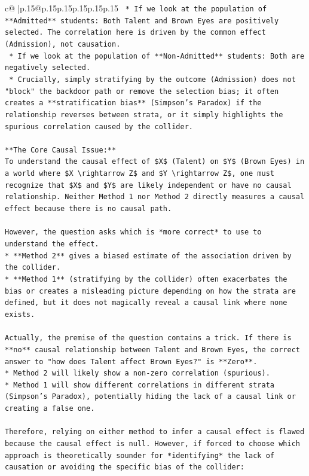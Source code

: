 \documentclass{article}
\begin{document}
{\begin{supertabular}{c@{$\;$}|p{.15\linewidth}@{}p{.15\linewidth}p{.15\linewidth}p{.15\linewidth}p{.15\linewidth}p{.15\linewidth}}
{{{\texttt{    *   If we look at the population of **Admitted** students: Both Talent and Brown Eyes are positively selected. The correlation here is driven by the common effect (Admission), not causation.} \\
\texttt{    *   If we look at the population of **Non{-}Admitted** students: Both are negatively selected.} \\
\texttt{    *   Crucially, simply stratifying by the outcome (Admission) does not "block" the backdoor path or remove the selection bias; it often creates a **stratification bias** (Simpson's Paradox) if the relationship reverses between strata, or it simply highlights the spurious correlation caused by the collider.} \\
\\ 
\texttt{**The Core Causal Issue:**} \\
\texttt{To understand the causal effect of \$X\$ (Talent) on \$Y\$ (Brown Eyes) in a world where \$X \textbackslash{}rightarrow Z\$ and \$Y \textbackslash{}rightarrow Z\$, one must recognize that \$X\$ and \$Y\$ are likely independent or have no causal relationship. Neither Method 1 nor Method 2 directly measures a causal effect because there is no causal path.} \\
\\ 
\texttt{However, the question asks which is *more correct* to use to understand the effect.} \\
\texttt{*   **Method 2** gives a biased estimate of the association driven by the collider.} \\
\texttt{*   **Method 1** (stratifying by the collider) often exacerbates the bias or creates a misleading picture depending on how the strata are defined, but it does not magically reveal a causal link where none exists.} \\
\\ 
\texttt{Actually, the premise of the question contains a trick. If there is **no** causal relationship between Talent and Brown Eyes, the correct answer to "how does Talent affect Brown Eyes?" is **Zero**.} \\
\texttt{*   Method 2 will likely show a non{-}zero correlation (spurious).} \\
\texttt{*   Method 1 will show different correlations in different strata (Simpson's Paradox), potentially hiding the lack of a causal link or creating a false one.} \\
\\ 
\texttt{Therefore, relying on either method to infer a causal effect is flawed because the causal effect is null. However, if forced to choose which approach is theoretically sounder for *identifying* the lack of causation or avoiding the specific bias of the collider:} \\
}}}
\end{supertabular}}
\end{document}
